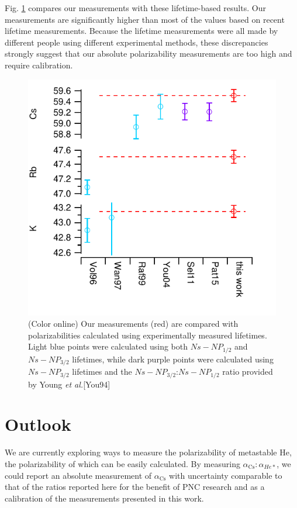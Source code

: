 \documentclass[twocolumn, prl,showpacs,superscriptaddress]{revtex4-1}   %
\newcommand{\figref}[1]{Fig. \ref{#1}}
\newcommand{\acs}{\alpha_{\textrm{Cs}}}
\newcommand{\etal}{\textit{et al.}}
\begin{document}
\figref{comparisonsLifetimes} compares our measurements with these lifetime-based results. Our measurements are significantly higher than most of the values based on recent lifetime measurements. Because the lifetime measurements were all made by different people using different experimental methods, these discrepancies strongly suggest that our absolute polarizability measurements are too high and require calibration.

\begin{figure}
\includegraphics[width=\linewidth,keepaspectratio]{displayLifeComps.pdf}
\caption{\label{comparisonsLifetimes}(Color online) Our measurements (red) are compared with polarizabilities calculated using experimentally measured lifetimes. Light blue points were calculated using both $Ns-NP_{1/2}$ and $Ns-NP_{3/2}$ lifetimes, while dark purple points were calculated using $Ns-NP_{3/2}$ lifetimes and the $Ns-NP_{3/2}$:$Ns-NP_{1/2}$ ratio provided by Young \etal [You94]}
\end{figure}
\section{Outlook}

We are currently exploring ways to measure the polarizability of metastable He, the polarizability of which can be easily calculated. By measuring $\acs:\alpha_{He*}$, we could report an absolute measurement of $\acs$ with uncertainty comparable to that of the ratios reported here for the benefit of PNC research and as a calibration of the measurements presented in this work.
\end{document}

